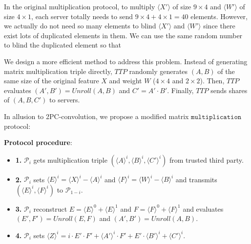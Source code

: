 \documentclass[letterpaper]{article} %
\begin{document}
    In the original multiplication protocol, to multiply $\langle X'\rangle$ of size $9\times 4$ and $\langle W'\rangle$ of size $4\times 1$,
    each server totally needs to send $9\times 4+4\times 1=40$ elements.
    However, we actually do not need so many elements to blind $\langle X'\rangle$ and $\langle W'\rangle$
    since there exist lots of duplicated elements in them.
    We can use the same random number to blind the duplicated element
    so that


    We design a more efficient method to address this problem.
    Instead of generating matrix multiplication triple directly,
    $TTP$ randomly generates $(A,B)$ of the same size of the original feature $X$ and weight $W$ ($4\times 4$ and $2\times 2$).
    Then, $TTP$ evaluates
    $( A',B')=Unroll(A,B)$ and
    $C' =A'\cdot B' $.
    Finally, $TTP$ sends shares of $(A,B,C')$ to servers.

    In allusion to 2PC-convolution, we propose a modified matrix $\mathtt{multiplication}$ protocol:

    \textbf{Protocol procedure}:
    \begin{itemize}
        \item \textbf{1.} $\mathcal{P}_{i}$ gets multiplication triple
        $(\langle A\rangle ^{i},\langle B\rangle ^{i},\langle C'\rangle ^{i})$ from trusted third party.
        \item \textbf{2.} $\mathcal{P}_{i}$ sets $\langle E\rangle ^{i}=\langle X\rangle ^{i}-\langle A\rangle ^{i}$ and $\langle F\rangle ^{i}=\langle W\rangle ^{i}-\langle B\rangle ^{i}$
        and transmits $(\langle E\rangle ^{i},\langle F\rangle ^{i})$ to $\mathcal{P}_{1-i}$.
        \item \textbf{3.} $\mathcal{P}_{i}$ reconstruct $E = \langle E\rangle ^{0}+\langle E\rangle ^{1}$ and $F = \langle F\rangle ^{0}+\langle F\rangle ^{1}$
        and evaluates $(E',F')=Unroll(E,F)$ and $(A',B')=Unroll(A,B)$.
        \item \textbf{4.} $\mathcal{P}_{i}$ sets $\langle Z\rangle^{i}=i\cdot E' \cdot F' + \langle A'\rangle^{i} \cdot F' + E' \cdot \langle B'\rangle^{i} + \langle C'\rangle^{i}$.

    \end{itemize}
\end{document}
